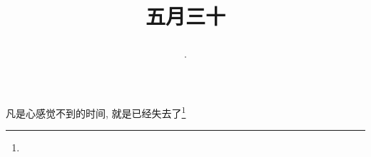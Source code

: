 \title{\date[d=5,m=7,y=2024][year:cn-y,年,month:cn,day:cn,日,·,weekday]·五月三十 }
凡是心感觉不到的时间, 就是已经失去了\footnote{ }

